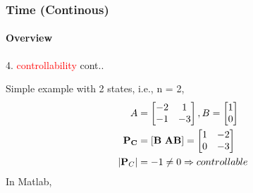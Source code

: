 \documentclass[hyperref={pdfpagelabels=true}]{beamer}
\begin{document}
\begin{frame}
\frametitle{Time (Continous)}
\framesubtitle{Overview }
4. \textcolor{red}{controllability} {\tiny cont..} \vfill
\footnotesize{
Simple example with 2 states, i.e., n = 2,
\begin{align*}
A&=\begin{bmatrix}
-2 & 1 \\-1 & -3
\end{bmatrix}, B=\begin{bmatrix}
1 \\ 0
\end{bmatrix} \\
{\bf P_C} &= [{\bf B \ AB}] = \begin{bmatrix}
1 & -2 \\0 & -3
\end{bmatrix}
\\
|{\bf P}_C| &= -1 \ne 0 \Rightarrow controllable
\end{align*}
In Matlab,
\begin{tcolorbox}[title=  ,width=9.85 cm]

\end{tcolorbox}
}
\end{frame}
\end{document}
